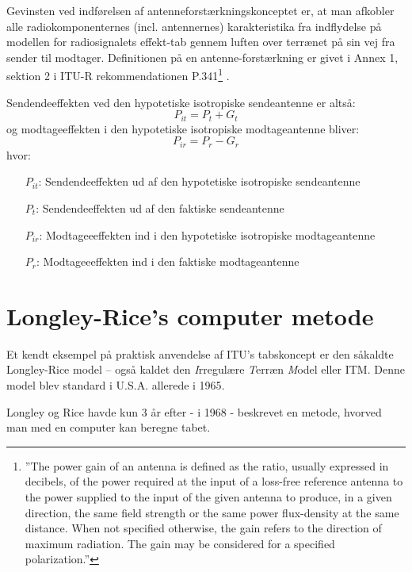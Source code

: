 Gevinsten ved indførelsen af antenneforstærkningskonceptet er, at man afkobler alle radiokomponenternes (incl. antennernes) karakteristika fra indflydelse på modellen for radiosignalets effekt-tab gennem luften over terrænet på sin vej fra sender til modtager. Definitionen på en antenne-forstærkning er givet i Annex 1, sektion 2 i ITU-R rekommendationen P.341\footnote{''The power gain of an antenna is defined as the ratio, usually expressed in decibels, of the power required at the input of a loss-free reference antenna to the power supplied to the input of the given antenna to produce, in a given direction, the same field strength or the same power flux-density at the same distance. When not specified otherwise, the gain refers to the direction of maximum radiation. The gain may be considered for a specified polarization.''} \cite{itur_p341-5}.

Sendendeeffekten ved den hypotetiske isotropiske sendeantenne er altså:
\begin{equation}
P_{it} = P_{t}+ G_t
\end{equation}
og modtageeffekten i den hypotetiske isotropiske modtageantenne bliver:
\begin{equation}
P_{ir} = P_{r}- G_r
\end{equation}
hvor:
\begin{itemize}[]
 \item [$P_{it}$:] Sendendeeffekten ud af den hypotetiske isotropiske sendeantenne 
 \item [$P_{t}$:] Sendendeeffekten ud af den faktiske sendeantenne
 \item [$P_{ir}$:] Modtageeeffekten ind i den hypotetiske isotropiske modtageantenne
 \item [$P_{r}$:] Modtageeeffekten ind i den faktiske modtageantenne
\end{itemize}
\FloatBarrier

\section{Longley-Rice's computer metode}
Et kendt eksempel på praktisk anvendelse af ITU's tabskoncept er den såkaldte Longley-Rice model -- også kaldet den \emph{I}rregulære \emph{T}erræn \emph{M}odel eller ITM. Denne model blev standard i U.S.A. allerede i 1965\cite{nbs-tn101}.

Longley og Rice havde kun 3 år efter - i 1968 - beskrevet en metode, hvorved man med en computer kan beregne tabet\cite{ntis-ad676874}.

